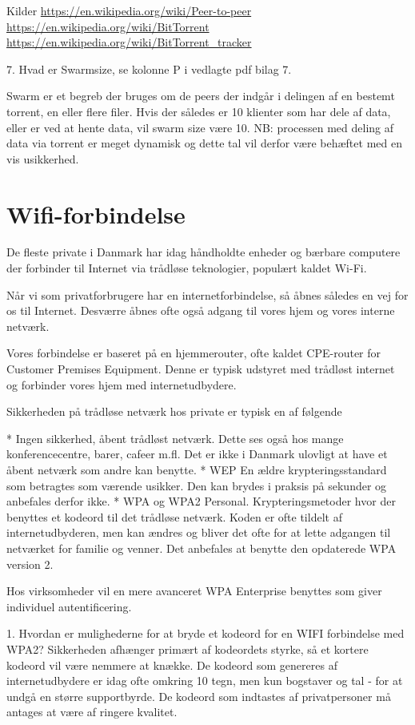 \documentclass[a4paper,11pt,notitlepage]{report}
\begin{document}
Kilder
\url{https://en.wikipedia.org/wiki/Peer-to-peer}
\url{https://en.wikipedia.org/wiki/BitTorrent}
\url{https://en.wikipedia.org/wiki/BitTorrent_tracker}

7.  Hvad er Swarmsize, se kolonne P i vedlagte pdf bilag 7.

Swarm er et begreb der bruges om de peers der indgår i delingen af en bestemt torrent, en eller flere filer. Hvis der således er 10 klienter som har dele af data, eller er ved at hente data, vil swarm size være 10. NB: processen med deling af data via torrent er meget dynamisk og dette tal vil derfor være behæftet med en vis usikkerhed.


\chapter{Wifi-forbindelse}

De fleste private i Danmark har idag håndholdte enheder og bærbare computere der forbinder til Internet via trådløse teknologier, populært kaldet Wi-Fi.

Når vi som privatforbrugere har en internetforbindelse, så åbnes således en vej for os til Internet. Desværre åbnes ofte også adgang til vores hjem og vores interne netværk.

Vores forbindelse er baseret på en hjemmerouter, ofte kaldet CPE-router for Customer Premises Equipment. Denne er typisk udstyret med trådløst internet og forbinder vores hjem med internetudbydere.

Sikkerheden på trådløse netværk hos private er typisk en af følgende

* Ingen sikkerhed, åbent trådløst netværk. Dette ses også hos mange konferencecentre, barer, cafeer m.fl. Det er ikke i Danmark ulovligt at have et åbent netværk som andre kan benytte.
* WEP En ældre krypteringsstandard som betragtes som værende usikker. Den kan brydes i praksis på sekunder og anbefales derfor ikke.
* WPA og WPA2 Personal. Krypteringsmetoder hvor der benyttes et kodeord til det trådløse netværk. Koden er ofte tildelt af internetudbyderen, men kan ændres og bliver det ofte for at lette adgangen til netværket for familie og venner. Det anbefales at benytte den opdaterede WPA version 2.

Hos virksomheder vil en mere avanceret WPA Enterprise benyttes som giver individuel autentificering.


1.  Hvordan er mulighederne for at bryde et kodeord for en WIFI forbindelse med WPA2?
Sikkerheden afhænger primært af kodeordets styrke, så et kortere kodeord vil være nemmere at knække. De kodeord som genereres af internetudbydere er idag ofte omkring 10 tegn, men kun bogstaver og tal - for at undgå en større supportbyrde. De kodeord som indtastes af privatpersoner må antages at være af ringere kvalitet.
\end{document}
